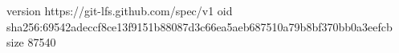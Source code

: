 version https://git-lfs.github.com/spec/v1
oid sha256:69542adeccf8ce13f9151b88087d3c66ea5aeb687510a79b8bf370bb0a3eefcb
size 87540
